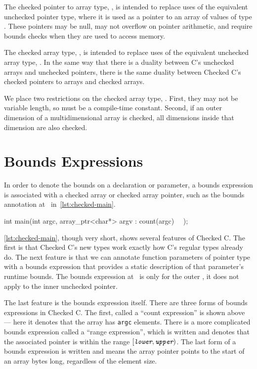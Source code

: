 The checked pointer to array type, \ArrayptrT, is intended to replace
uses of the equivalent unchecked pointer type, where it is used as a
pointer to an array of values of type . These pointers may be
null, may not overflow on pointer arithmetic, and require bounds
checks when they are used to access memory.

The checked array type, , is intended to replace
uses of the equivalent unchecked array type, .
In the same way that there is a duality between C's unchecked arrays
and unchecked pointers, there is the same duality between Checked C's
checked pointers to arrays and checked arrays.

We place two restrictions on the checked array type,
. First, they may not be variable length, so
 must be a compile-time constant. Second, if an outer
dimension of a multidimensional array is checked, all dimensions
inside that dimension are also checked.

\section{Bounds Expressions}

In order to denote the bounds on a declaration or parameter, a bounds
expression is associated with a checked array or checked array
pointer, such as the bounds annotation at~
in~\autoref{lst:checked-main}.

\begin{code}[label=lst:checked-main,%
caption={Declaration of \lstinline|main| in a Checked C program}]
int main(int argc, array_ptr<char*> argv : count(argc) ~~);
\end{code}

\autoref{lst:checked-main}, though very short, shows several features
of Checked C. The first is that Checked C's new types work exactly how
C's regular types already do. The next feature is that we can annotate
function parameters of pointer type with a bounds expression that
provides a static description of that parameter's runtime bounds. The
bounds expression at~ is only for the outer
\ArrayptrT, it does not apply to the inner unchecked pointer.

The last feature is the bounds expression itself. There are three
forms of bounds expressions in Checked C. The first, called a ``count
expression'' is shown above --- here it denotes that the array has
\lstinline|argc| elements. There is a more complicated bounds
expression called a ``range expression'', which is written
 and denotes that the associated
pointer is within the range $[\mv{lower}, \mv{upper})$. The last form
of a bounds expression is written  and means
the array pointer points to the start of an array  bytes long,
regardless of the element size.

